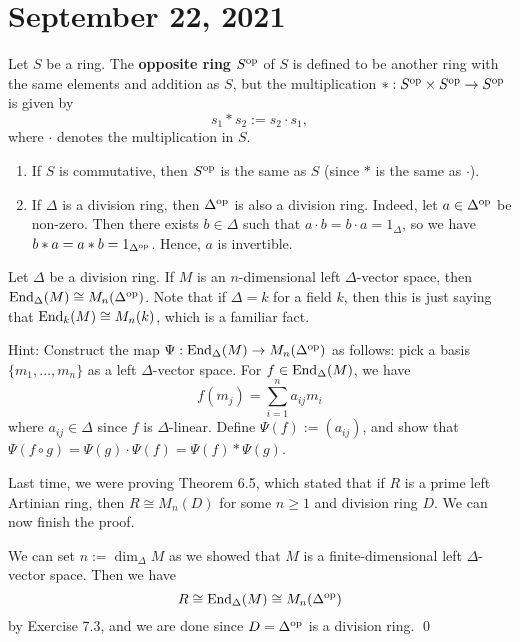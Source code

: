 \section{September 22, 2021}

\begin{defn}{}
Let $S$ be a ring. The {\bf opposite ring} $S^{\operatorname{op}}$ of $S$ is defined to be another ring with 
the same elements and addition as $S$, but the multiplication $* : S^{\operatorname{op}} \times S^{\operatorname{op}} \to S^{\operatorname{op}}$ is given by 
\[ s_1 * s_2 := s_2 \cdot s_1, \]
where $\cdot$ denotes the multiplication in $S$. 
\end{defn}

\begin{remark}{}
\begin{enumerate}[(1)]
    \item If $S$ is commutative, then $S^{\operatorname{op}}$ is the same as $S$ (since $*$ is the same as $\cdot$).
    \item If $\Delta$ is a division ring, then $\Delta^{\operatorname{op}}$ is also a division ring. Indeed, 
    let $a \in \Delta^{\operatorname{op}}$ be non-zero. Then there exists $b \in \Delta$ such that 
    $a \cdot b = b \cdot a = 1_\Delta$, so we have $b * a = a * b = 1_{\Delta^{\operatorname{op}}}$. Hence, 
    $a$ is invertible. 
\end{enumerate}
\end{remark}

\begin{exercise}{}
Let $\Delta$ be a division ring. If $M$ is an $n$-dimensional left $\Delta$-vector space, then 
$\operatorname{End}_\Delta(M) \cong M_n(\Delta^{\operatorname{op}})$. Note that if $\Delta = k$ for a field $k$, then this is just saying that $\operatorname{End}_k(M) \cong M_n(k)$, which is a familiar fact.

Hint: Construct the map $\Psi : \operatorname{End}_\Delta(M) \to M_n(\Delta^{\operatorname{op}})$ as follows: pick a basis 
$\{m_1, \dots, m_n\}$ as a left $\Delta$-vector space. For $f \in \operatorname{End}_\Delta(M)$, we have 
\[ f(m_j) = \sum_{i=1}^n a_{ij} m_i \]
where $a_{ij} \in \Delta$ since $f$ is $\Delta$-linear. Define $\Psi(f) := (a_{ij})$, and 
show that $\Psi(f \circ g) = \Psi(g) \cdot \Psi(f) = \Psi(f) * \Psi(g)$. 
\end{exercise}

Last time, we were proving Theorem 6.5, which stated that if $R$ is a prime left Artinian ring, 
then $R \cong M_n(D)$ for some $n \geq 1$ and division ring $D$. We can now finish the proof. 

We can set $n := \dim_\Delta M$ as we showed that $M$ is a finite-dimensional left $\Delta$-vector space.
Then we have 
\[ R \cong \operatorname{End}_\Delta(M) \cong M_n(\Delta^{\operatorname{op}}) \]
by Exercise 7.3, and we are done since $D = \Delta^{\operatorname{op}}$ is a division ring. \qed


